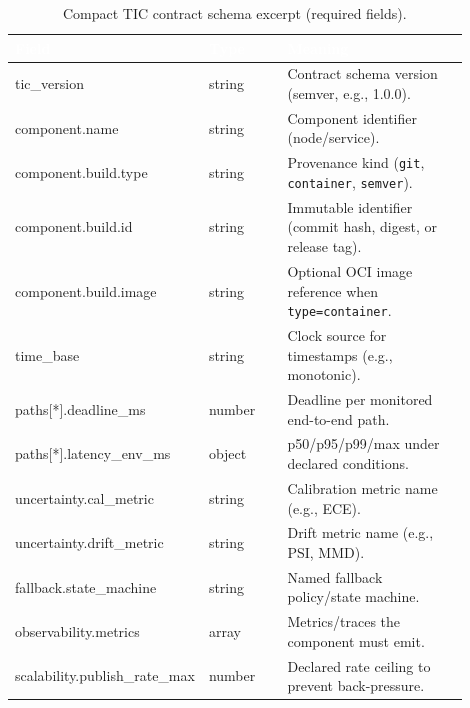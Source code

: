 \documentclass[smallextended]{svjour3}
\begin{document}
\begin{table}[htbp]
  \centering
  \small
  \caption{Compact TIC contract schema excerpt (required fields).}
  \label{tab:tic_schema_excerpt}
  \renewcommand{\arraystretch}{1.15}
  \begin{tabular}{@{}L{0.30\linewidth}L{0.18\linewidth}L{0.42\linewidth}@{}}
    \toprule
    \textcolor{white}{\textbf{Field}} &
    \textcolor{white}{\textbf{Type}} &
    \textcolor{white}{\textbf{Meaning}} \\
    \midrule
    tic\_version & string & Contract schema version (semver, e.g., 1.0.0). \\
    component.name & string & Component identifier (node/service). \\
    component.build.type & string & Provenance kind (\texttt{git}, \texttt{container}, \texttt{semver}). \\
    component.build.id & string & Immutable identifier (commit hash, digest, or release tag). \\
    component.build.image & string & Optional OCI image reference when \texttt{type=container}. \\
    time\_base & string & Clock source for timestamps (e.g., monotonic). \\
    paths[*].deadline\_ms & number & Deadline per monitored end-to-end path. \\
    paths[*].latency\_env\_ms & object & p50/p95/p99/max under declared conditions. \\
    uncertainty.cal\_metric & string & Calibration metric name (e.g., ECE). \\
    uncertainty.drift\_metric & string & Drift metric name (e.g., PSI, MMD). \\
    fallback.state\_machine & string & Named fallback policy/state machine. \\
    observability.metrics & array & Metrics/traces the component must emit. \\
    scalability.publish\_rate\_max & number & Declared rate ceiling to prevent back-pressure. \\
    \bottomrule
  \end{tabular}
  \renewcommand{\arraystretch}{1}
\end{table}
\end{document}
